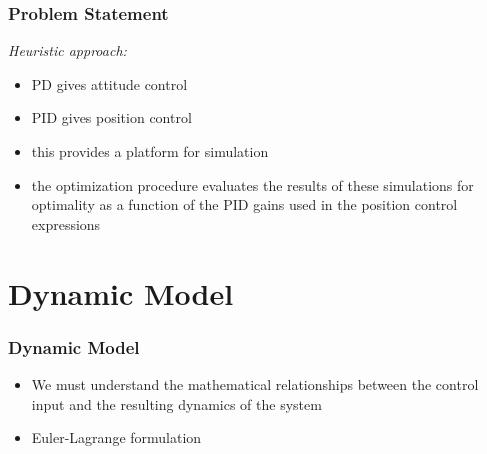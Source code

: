 \documentclass{beamer}
\begin{document}
\begin{frame}
\frametitle{Problem Statement}

\textit{Heuristic approach:}

\begin{itemize}
	\item PD gives attitude control
	\item PID gives position control
	\item this provides a platform for simulation
	\item the optimization procedure evaluates the results of these simulations for optimality as a function of the PID gains used in the position control expressions
\end{itemize}

\end{frame}



\section{Dynamic Model}




\begin{frame}
\frametitle{Dynamic Model}

\begin{itemize}
	\item We must understand the mathematical relationships between the control input and the resulting dynamics of the system
	\item Euler-Lagrange formulation
\end{itemize}

\end{frame}




\end{document}
